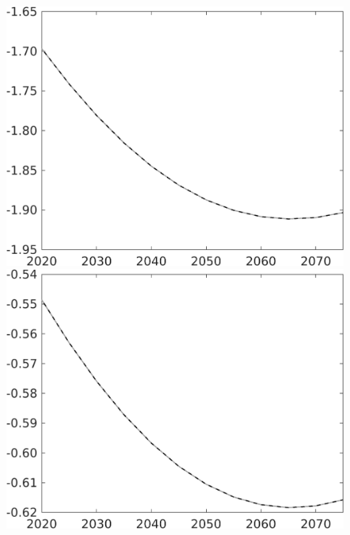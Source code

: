 \documentclass[12pt]{article}
\begin{document}
\begin{figure}[h!!]
\begin{minipage}[]{0.32\textwidth}
	\end{minipage}	
	\begin{minipage}[]{0.32\textwidth}
		\includegraphics[width=1\textwidth]{../../codding_model/own_basedOnFried/optimalPol_010922_revision/figures/all_13Sept22/PerdifNoTauf_regime0_CompTaul_pf_spillover0_nsk1_xgr1_knspil1_sep1_LFlimit0_emsbase0_countec0_GovRev0_etaa0.79_lgd0.png}
	\end{minipage}	
	\begin{minipage}[]{0.32\textwidth}
		\includegraphics[width=1\textwidth]{../../codding_model/own_basedOnFried/optimalPol_010922_revision/figures/all_13Sept22/PerdifNoTauf_regime0_CompTaul_pg_spillover0_nsk1_xgr1_knspil1_sep1_LFlimit0_emsbase0_countec0_GovRev0_etaa0.79_lgd0.png}

\end{minipage}
\end{figure}
\end{document}
